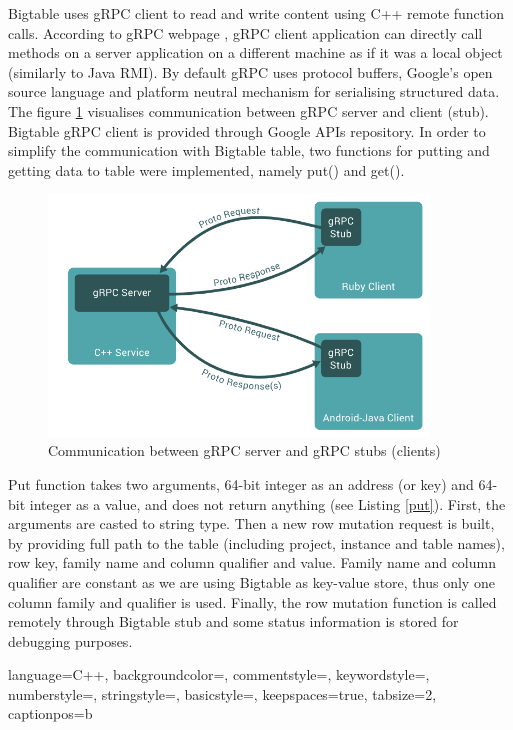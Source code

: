 \documentclass[bsc,frontabs,twoside,singlespacing,parskip,deptreport]{infthesis}     %
\begin{document}
Bigtable uses gRPC client to read and write content using C++ remote function calls. According to gRPC webpage \citep{grpc}, gRPC client application can directly call methods on a server application on a different machine as if it was a local object (similarly to Java RMI). By default gRPC uses protocol buffers, Google's open source language and platform neutral mechanism for serialising structured data. The figure \ref{fig:grpc} visualises communication between gRPC server and client (stub). Bigtable gRPC client is provided through Google APIs repository. In order to simplify the communication with Bigtable table, two functions for putting and getting data to table were implemented, namely put() and get().

\begin{figure}[H]
\centering
\includegraphics[width=0.9\textwidth]{images/grpc}
\caption{Communication between gRPC server and gRPC stubs (clients) \cite[source:][Guides page]{grpc}}
\label{fig:grpc}
\end{figure}

Put function takes two arguments, 64-bit integer as an address (or key) and 64-bit integer as a value, and does not return anything (see Listing \ref{put}). First, the arguments are casted to string type. Then a new row mutation request is built, by providing full path to the table (including project, instance and table names), row key, family name and column qualifier and value. Family name and column qualifier are constant as we are using Bigtable as key-value store, thus only one column family and qualifier is used. Finally, the row mutation function is called remotely through Bigtable stub and some status information is stored for debugging purposes.

 {
  language=C++,
  backgroundcolor=\color{backcolour},   
  commentstyle=\color{codegreen},
  keywordstyle=\color{Maroon},
  numberstyle=\tiny\color{codegray},
  stringstyle=\color{magenta},
  basicstyle=\footnotesize,                 
  keepspaces=true,                                           
  tabsize=2,
  captionpos=b
}
\end{document}

